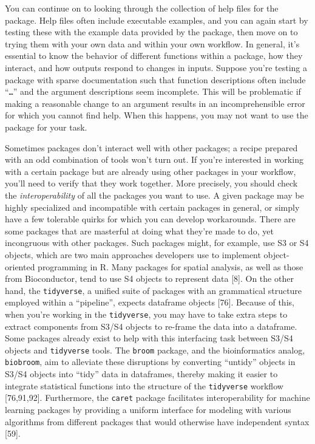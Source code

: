 \documentclass[10pt,letterpaper]{article}
\begin{document}
You can continue on to looking through the collection of help files for
the package. Help files often include executable examples, and you can
again start by testing these with the example data provided by the
package, then move on to trying them with your own data and within your
own workflow. In general, it's essential to know the behavior of
different functions within a package, how they interact, and how outputs
respond to changes in inputs. Suppose you're testing a package with
sparse documentation such that function descriptions often include
``\texttt{\ldots{}}'' and the argument descriptions seem incomplete.
This will be problematic if making a reasonable change to an argument
results in an incomprehensible error for which you cannot find help.
When this happens, you may not want to use the package for your task.

Sometimes packages don't interact well with other packages; a recipe
prepared with an odd combination of tools won't turn out. If you're
interested in working with a certain package but are already using other
packages in your workflow, you'll need to verify that they work
together. More precisely, you should check the \emph{interoperability}
of all the packages you want to use. A given package may be highly
specialized and incompatible with certain packages in general, or simply
have a few tolerable quirks for which you can develop workarounds. There
are some packages that are masterful at doing what they're made to do,
yet incongruous with other packages. Such packages might, for example,
use S3 or S4 objects, which are two main approaches developers use to
implement object-oriented programming in R. Many packages for spatial
analysis, as well as those from Bioconductor, tend to use S4 objects to
represent data {[}8{]}. On the other hand, the \texttt{tidyverse}, a
unified suite of packages with an grammatical structure employed within
a ``pipeline'', expects dataframe objects {[}76{]}. Because of this,
when you're working in the \texttt{tidyverse}, you may have to take
extra steps to extract components from S3/S4 objects to re-frame the
data into a dataframe. Some packages already exist to help with this
interfacing task between S3/S4 objects and \texttt{tidyverse} tools. The
\texttt{broom} package, and the bioinformatics analog,
\texttt{biobroom}, aim to alleviate these disruptions by converting
``untidy'' objects in S3/S4 objects into ``tidy'' data in dataframes,
thereby making it easier to integrate statistical functions into the
structure of the \texttt{tidyverse} workflow {[}76,91,92{]}.
Furthermore, the \texttt{caret} package facilitates interoperability for
machine learning packages by providing a uniform interface for modeling
with various algorithms from different packages that would otherwise
have independent syntax {[}59{]}.
\end{document}
